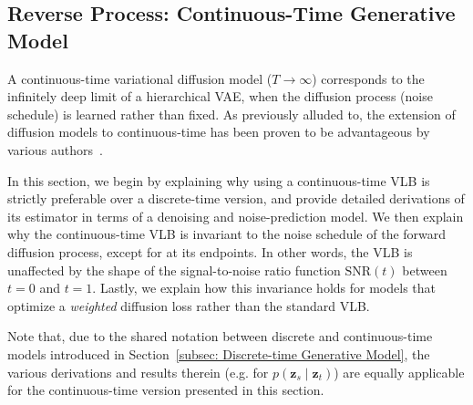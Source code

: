 \newpage
\subsection{Reverse Process: Continuous-Time Generative Model}
\label{subsec: Continuous-time Generative Model}
%
A continuous-time variational diffusion model ($T \to \infty$) corresponds to the infinitely deep limit of a hierarchical VAE, when the diffusion process (noise schedule) is learned rather than fixed. As previously alluded to, the extension of diffusion models to continuous-time has been proven to be advantageous by various authors~\citep{song2021scorebased,kingma2021variational,huang2021variational,vahdat2021score}.

In this section, we begin by explaining why using a continuous-time VLB is strictly preferable over a discrete-time version, and provide detailed derivations of its estimator in terms of a denoising and noise-prediction model. We then explain why the continuous-time VLB is invariant to the noise schedule of the forward diffusion process, except for at its endpoints. In other words, the VLB is unaffected by the shape of the signal-to-noise ratio function $\mathrm{SNR}(t)$ between $t=0$ and $t=1$. Lastly, we explain how this invariance holds for models that optimize a \textit{weighted} diffusion loss rather than the standard VLB.

Note that, due to the shared notation between discrete and continuous-time models introduced in Section~\ref{subsec: Discrete-time Generative Model}, the various derivations and results therein (e.g. for $p(\mathbf{z}_s \mid \mathbf{z}_t)$) are equally applicable for the continuous-time version presented in this section.
%
